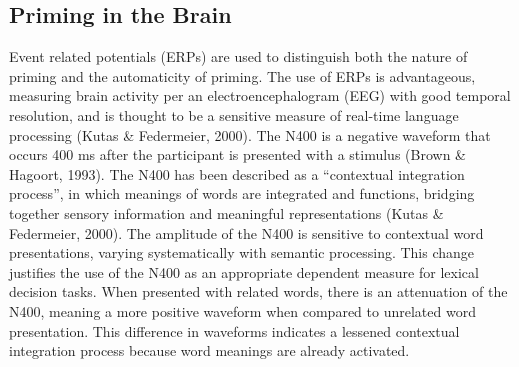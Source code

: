 \documentclass[english,man]{apa6}
\theoremstyle{definition}
\theoremstyle{definition}
\theoremstyle{definition}
\theoremstyle{remark}
\begin{document}
\subsection{Priming in the Brain}\label{priming-in-the-brain}

Event related potentials (ERPs) are used to distinguish both the nature
of priming and the automaticity of priming. The use of ERPs is
advantageous, measuring brain activity per an electroencephalogram (EEG)
with good temporal resolution, and is thought to be a sensitive measure
of real-time language processing (Kutas \& Federmeier, 2000). The N400
is a negative waveform that occurs 400 ms after the participant is
presented with a stimulus (Brown \& Hagoort, 1993). The N400 has been
described as a \enquote{contextual integration process}, in which
meanings of words are integrated and functions, bridging together
sensory information and meaningful representations (Kutas \& Federmeier,
2000). The amplitude of the N400 is sensitive to contextual word
presentations, varying systematically with semantic processing. This
change justifies the use of the N400 as an appropriate dependent measure
for lexical decision tasks. When presented with related words, there is
an attenuation of the N400, meaning a more positive waveform when
compared to unrelated word presentation. This difference in waveforms
indicates a lessened contextual integration process because word
meanings are already activated.
\end{document}
